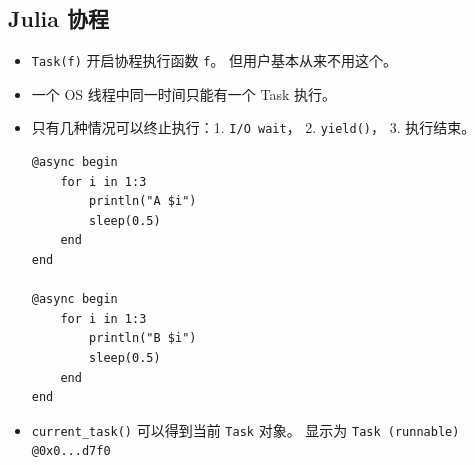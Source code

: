 \subsection{Julia 协程}
\begin{itemize}
\item \verb`Task(f)` 开启协程执行函数 \verb`f`。 但用户基本从来不用这个。
\item 一个 OS 线程中同一时间只能有一个 Task 执行。
\item 只有几种情况可以终止执行：1. \verb`I/O wait`， 2. \verb`yield()`， 3. 执行结束。
\begin{lstlisting}[language=none]
@async begin
    for i in 1:3
        println("A $i")
        sleep(0.5)
    end
end

@async begin
    for i in 1:3
        println("B $i")
        sleep(0.5)
    end
end
\end{lstlisting}
\item \verb`current_task()` 可以得到当前 \verb`Task` 对象。 显示为 \verb`Task (runnable) @0x0...d7f0`
\end{itemize}
